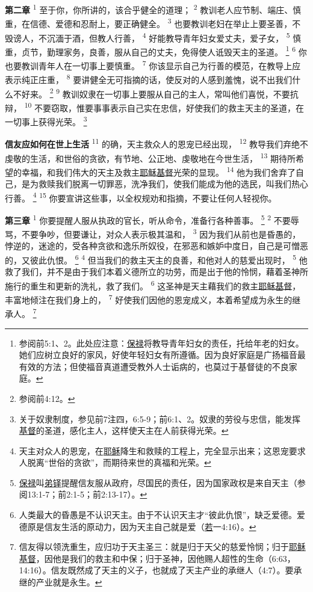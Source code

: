 \textbf{第二章\quad}
\textsuperscript{1}
至于你，你所讲的，该合乎健全的道理；
\textsuperscript{2}
教训老人应节制、端庄、慎重，在信德、爱德和忍耐上，要正确健全。
\textsuperscript{3}
也要教训老妇在举止上要圣善，不毁谤人，不沉湎于酒，但教人行善，
\textsuperscript{4}
好能教导青年妇女爱丈夫，爱子女，
\textsuperscript{5}
慎重，贞节，勤理家务，良善，服从自己的丈夫，免得使人诋毁天主的圣道。
\footnote{参阅前5:1、2。此处应注意：\uline{保禄}将教导青年妇女的责任，托给年老的妇女。她们应树立良好的家风，好使年轻妇女有所遵循。因为良好家庭是广扬福音最有效的方法；但使福音真道遭受教外人士诟病的，也莫过于基督徒的不良家庭。}
\textsuperscript{6}
你也要教训青年人在一切事上要慎重。
\textsuperscript{7}
你该显示自己为行善的模范，在教导上应表示纯正庄重，
\textsuperscript{8}
要讲健全无可指摘的话，使反对的人感到羞愧，说不出我们什么不好来。
\footnote{参阅前4:12。}
\textsuperscript{9}
教训奴隶在一切事上要服从自己的主人，常叫他们喜悦，不要抗辩，
\textsuperscript{10}
不要窃取，惟要事事表示自己实在忠信，好使我们的救主天主的圣道，在一切事上获得光荣。
\footnote{关于奴隶制度，参见前7注四，6:5-9；前6:1、2。奴隶的劳役与忠信，能发挥\uline{基督}的圣道，感化主人，这样使天主在人前获得光荣。}

\textbf{信友应如何在世上生活\quad}
\textsuperscript{11}
的确，天主救众人的恩宠已经出现，
\textsuperscript{12}
教导我们弃绝不虔敬的生活，和世俗的贪欲，有节地、公正地、虔敬地在今世生活，
\textsuperscript{13}
期待所希望的幸福，和我们伟大的天主及救主\uline{耶稣}\uline{基督}光荣的显现。
\textsuperscript{14}
他为我们舍弃了自己，是为救赎我们脱离一切罪恶，洗净我们，使我们能成为他的选民，叫我们热心行善。
\footnote{天主对众人的恩宠，在\uline{耶稣}降生和救赎的工程上，完全显示出来；这恩宠要求人脱离“世俗的贪欲”，而期待来世的真福和光荣。}
\textsuperscript{15}
你要宣讲这些事，以全权规劝和指摘，不要让任何人轻视你。

\textbf{第三章\quad}
\textsuperscript{1}
你要提醒人服从执政的官长，听从命令，准备行各种善事。
\footnote{\uline{保禄}叫\uline{弟铎}提醒信友服从政府，尽国民的责任，因为国家政权是来自天主（参阅13:1-7；前2:1-5；前2:13-17）。}
\textsuperscript{2}
不要辱骂，不要争吵，但要谦让，对众人表示极其温和，
\textsuperscript{3}
因为我们从前也是昏愚的，悖逆的，迷途的，受各种贪欲和逸乐所奴役，在邪恶和嫉妒中度日，自己是可憎恶的，又彼此仇恨。
\footnote{人类最大的昏愚是不认识天主。由于不认识天主才“彼此仇恨”，缺乏爱德。爱德原是信友生活的原动力，因为天主自己就是爱（\uline{若}一4:16）。}
\textsuperscript{4}
但当我们的救主天主的良善，和他对人的慈爱出现时，
\textsuperscript{5}
他救了我们，并不是由于我们本着义德所立的功劳，而是出于他的怜悯，藉着圣神所施行的重生和更新的洗礼，救了我们。
\textsuperscript{6}
这圣神是天主藉我们的救主\uline{耶稣}\uline{基督}，丰富地倾注在我们身上的，
\textsuperscript{7}
好使我们因他的恩宠成义，本着希望成为永生的继承人。
\footnote{信友得以领洗重生，应归功于天主圣三：就是归于天父的慈爱怜悯；归于\uline{耶稣}\uline{基督}，因他是我们的救主和中保；归于圣神，因他赐人超性的生命（6:63，14:16）。信友既然成了天主的义子，也就成了天主产业的承继人（4:7）。要承继的产业就是永生。}

